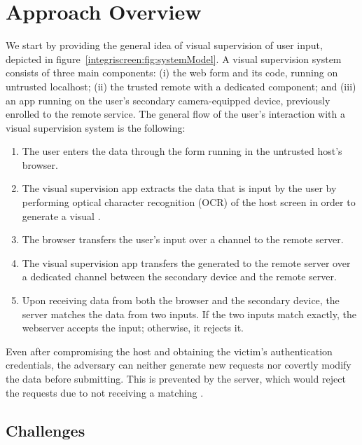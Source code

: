 \section{Approach Overview}
\label{integriscreen:sec:systemDesign}


We start by providing the general idea of visual supervision of user input, depicted in figure~\ref{integriscreen:fig:systemModel}.
A visual supervision system consists of three main components: (i) the web form and its code, running on untrusted localhost; (ii) the trusted remote \server with a dedicated component; and (iii) an app running on the user's secondary camera-equipped device, previously enrolled to the remote service. The general flow of the user's interaction with a visual supervision system is the following:

\begin{enumerate}
  \item[\one] The user enters the data through the form running in the untrusted host's browser.

  \item[\two] The visual supervision app extracts the data that is input by the user by performing optical character recognition (OCR) of the host screen in order to generate a visual \textit{\POI}.

  \item[\three] The browser transfers the user's input over a \https channel to the remote server.

  \item[\four] The visual supervision app transfers the generated \POI to the remote server over a dedicated \tls channel between the secondary device and the remote server.

  \item[\five] Upon receiving data from both the browser and the secondary device, the server matches the data from two inputs.
  If the two inputs match exactly, the webserver accepts the input; otherwise, it rejects it.
\end{enumerate}


Even after compromising the host and obtaining the victim's authentication credentials, the adversary can neither generate new requests nor covertly modify the data before submitting. This is prevented by the server, which would reject the requests due to not receiving a matching \POI.


\subsection{Challenges}
\label{sec:systemDesign:challenger}

